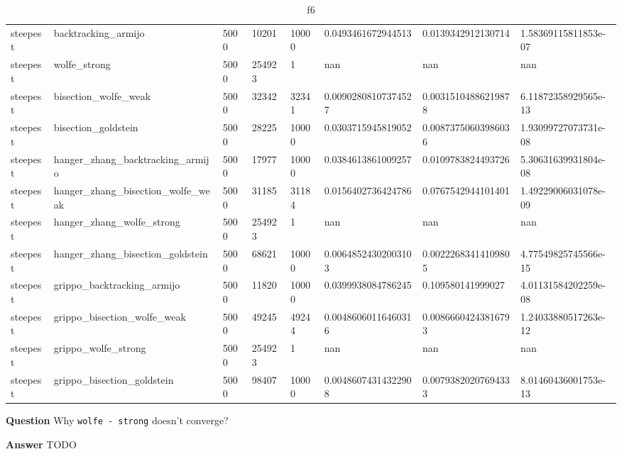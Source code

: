 \documentclass[a4paper,11pt]{article}
\numberwithin{equation}{section} %
\begin{document}
\begin{table}[h!]
{\begin{tabular}{|l|l|l|l|l|l|l|l|}
        steepest & backtracking\_armijo & 5000 & 10201 & 10000 & 0.0493461672944513 & 0.0139342912130714 & 1.58369115811853e-07 \\
        steepest & wolfe\_strong & 5000 & 254923 & 1 & nan & nan & nan \\
        steepest & bisection\_wolfe\_weak & 5000 & 32342 & 32341 & 0.00902808107374527 & 0.00315104886219878 & 6.11872358929565e-13 \\
        steepest & bisection\_goldstein & 5000 & 28225 & 10000 & 0.0303715945819052 & 0.00873750603986036 & 1.93099727073731e-08 \\
        steepest & hanger\_zhang\_backtracking\_armijo & 5000 & 17977 & 10000 & 0.0384613861009257 & 0.0109783824493726 & 5.30631639931804e-08 \\
        steepest & hanger\_zhang\_bisection\_wolfe\_weak & 5000 & 31185 & 31184 & 0.0156402736424786 & 0.0767542944101401 & 1.49229006031078e-09 \\
        steepest & hanger\_zhang\_wolfe\_strong & 5000 & 254923 & 1 & nan & nan & nan \\
        steepest & hanger\_zhang\_bisection\_goldstein & 5000 & 68621 & 10000 & 0.00648524302003103 & 0.00222683414109805 & 4.77549825745566e-15 \\
        steepest & grippo\_backtracking\_armijo & 5000 & 11820 & 10000 & 0.0399938084786245 & 0.109580141999027 & 4.01131584202259e-08 \\
        steepest & grippo\_bisection\_wolfe\_weak & 5000 & 49245 & 49244 & 0.00486060116460316 & 0.00866604243816793 & 1.24033880517263e-12 \\
        steepest & grippo\_wolfe\_strong & 5000 & 254923 & 1 & nan & nan & nan \\
        steepest & grippo\_bisection\_goldstein & 5000 & 98407 & 10000 & 0.00486074314322908 & 0.00793820207694333 & 8.01460436001753e-13 \\

\end{tabular}}
\caption{f6}
\label{table:f6}
\end{table}

\clearpage

\textbf{Question}
Why \verb|wolfe - strong| doesn't converge?

\textbf{Answer}
TODO
\end{document}

